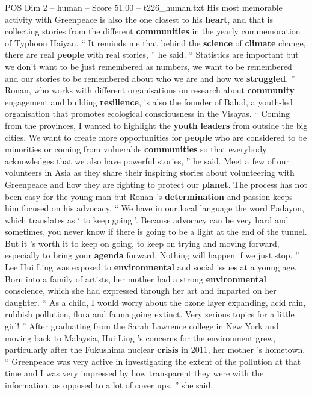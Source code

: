 \begin{textsample}{POS Dim 2 – human – Score 51.00 – t226\_human.txt}
His most memorable activity with Greenpeace is also the one closest to his \textbf{heart}, and that is collecting stories from the different \textbf{communities} in the yearly commemoration of Typhoon Haiyan. “ It reminds me that behind the \textbf{science} of \textbf{climate} change, there are real \textbf{people} with real stories, ” he said. “ Statistics are important but we don't want to be just remembered as numbers, we want to be remembered and our stories to be remembered about who we are and how we \textbf{struggled}. ” Ronan, who works with different organisations on research about \textbf{community} engagement and building \textbf{resilience}, is also the founder of Balud, a youth-led organisation that promotes ecological consciousness in the Visayas. “ Coming from the provinces, I wanted to highlight the \textbf{youth} \textbf{leaders} from outside the big cities.
We want to create more opportunities for \textbf{people} who are considered to be minorities or coming from vulnerable \textbf{communities} so that everybody acknowledges that we also have powerful stories, ” he said.
Meet a few of our volunteers in Asia as they share their inspiring stories about volunteering with Greenpeace and how they are fighting to protect our \textbf{planet}.
The process has not been easy for the young man but Ronan ’s \textbf{determination} and passion keeps him focused on his advocacy. “ We have in our local language the word Padayon, which translates as ‘ to keep going ’.
Because advocacy can be very hard and sometimes, you never know if there is going to be a light at the end of the tunnel.
But it ’s worth it to keep on going, to keep on trying and moving forward, especially to bring your \textbf{agenda} forward.
Nothing will happen if we just stop. ” Lee Hui Ling was exposed to \textbf{environmental} and social issues at a young age.
Born into a family of artists, her mother had a strong \textbf{environmental} conscience, which she had expressed through her art and imparted on her daughter. “ As a child, I would worry about the ozone layer expanding, acid rain, rubbish pollution, flora and fauna going extinct.
Very serious topics for a little girl! ” After graduating from the Sarah Lawrence college in New York and moving back to Malaysia, Hui Ling ’s concerns for the environment grew, particularly after the Fukushima nuclear \textbf{crisis} in 2011, her mother ’s hometown. “ Greenpeace was very active in investigating the extent of the pollution at that time and I was very impressed by how transparent they were with the information, as opposed to a lot of cover ups, ” she said.

\end{textsample}
